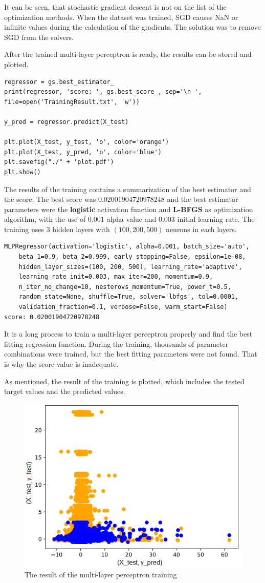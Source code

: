 It can be seen, that stochastic gradient descent is not on the list of the optimization methods. When the dataset was trained, SGD causes NaN or infinite values during the calculation of the gradients. The solution was to remove SGD from the solvers. \medskip

After the trained multi-layer perceptron is ready, the results can be stored and plotted.
\begin{lstlisting}
regressor = gs.best_estimator_
print(regressor, 'score: ', gs.best_score_, sep='\n ', file=open('TrainingResult.txt', 'w'))

y_pred = regressor.predict(X_test)

plt.plot(X_test, y_test, 'o', color='orange')
plt.plot(X_test, y_pred, 'o', color='blue')
plt.savefig("./" + 'plot.pdf')
plt.show()
\end{lstlisting}

\medskip The results of the training contains a summarization of the best estimator and the score. The best score was $0.02001904720978248$ and the best estimator parameters were the \textbf{logistic} activation function and \textbf{L-BFGS} as optimization algorithm, with the use of $0.001$ alpha value and $0.003$ initial learning rate. The training uses $3$ hidden layers with $(100,200,500)$ neurons in each layers.
\begin{lstlisting}
MLPRegressor(activation='logistic', alpha=0.001, batch_size='auto',
	beta_1=0.9, beta_2=0.999, early_stopping=False, epsilon=1e-08,
	hidden_layer_sizes=(100, 200, 500), learning_rate='adaptive',
	learning_rate_init=0.003, max_iter=200, momentum=0.9,
	n_iter_no_change=10, nesterovs_momentum=True, power_t=0.5,
	random_state=None, shuffle=True, solver='lbfgs', tol=0.0001,
	validation_fraction=0.1, verbose=False, warm_start=False)
score: 0.02001904720978248
\end{lstlisting}

\medskip It is a long process to train a multi-layer perceptron properly and find the best fitting regression function. During the training, thousands of parameter combinations were trained, but the best fitting parameters were not found. That is why the score value is inadequate.\medskip

As mentioned, the result of the training is plotted, which includes the tested target values and the predicted values.
\begin{figure}[h]
	\centering
	\includegraphics[height=0.45\linewidth]{./figures/plot}
	\caption{The result of the multi-layer perceptron training}
	\label{fig:plot}
\end{figure}

